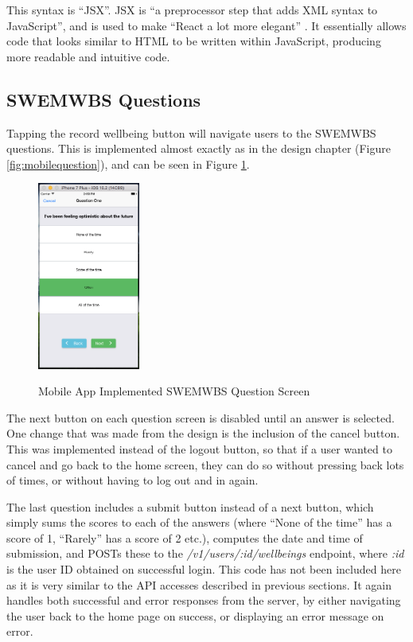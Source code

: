 \documentclass[11pt,openright,a4paper]{report}
\begin{document}
This syntax is \enquote{JSX}. JSX is \enquote{a preprocessor step that adds XML syntax to JavaScript}, and is used to make \enquote{React a lot more elegant} \parencite{jsx}. It essentially allows code that looks similar to HTML to be written within JavaScript, producing more readable and intuitive code.

\subsection{SWEMWBS Questions}
Tapping the record wellbeing button will navigate users to the SWEMWBS questions. This is implemented almost exactly as in the design chapter (Figure \ref{fig:mobilequestion}), and can be seen in Figure \ref{fig:mobilequestionimpl}.

\begin{figure}[ht]
\centering
\caption{Mobile App Implemented SWEMWBS Question Screen}
\includegraphics[width=0.3\textwidth]{i/mobilequestionimpl.png}
\label{fig:mobilequestionimpl}
\end{figure}

The next button on each question screen is disabled until an answer is selected. One change that was made from the design is the inclusion of the cancel button. This was implemented instead of the logout button, so that if a user wanted to cancel and go back to the home screen, they can do so without pressing back lots of times, or without having to log out and in again.

The last question includes a submit button instead of a next button, which simply sums the scores to each of the answers (where \enquote{None of the time} has a score of 1, \enquote{Rarely} has a score of 2 etc.), computes the date and time of submission, and POSTs these to the \emph{/v1/users/:id/wellbeings} endpoint, where \emph{:id} is the user ID obtained on successful login. This code has not been included here as it is very similar to the API accesses described in previous sections. It again handles both successful and error responses from the server, by either navigating the user back to the home page on success, or displaying an error message on error.
\end{document}
